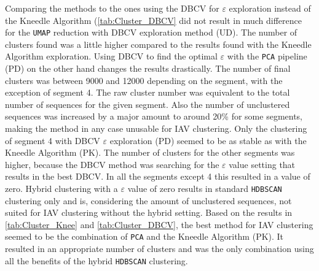 \vspace{1em}

Comparing the methods to the ones using the \gls{DBCV} for $\varepsilon$ exploration instead of the Kneedle Algorithm (\autoref{tab:Cluster_DBCV} did not result in much difference for the \texttt{UMAP} reduction with \gls{DBCV} exploration method (UD). The number of clusters found was a little higher compared to the results found with the Kneedle Algorithm exploration. Using \gls{DBCV} to find the optimal $\varepsilon$ with the \texttt{PCA} pipeline (PD) on the other hand changes the results drastically. The number of final clusters was between 9000 and 12000 depending on the segment, with the exception of segment 4. The raw cluster number was equivalent to the total number of sequences for the given segment. Also the number of unclustered sequences was increased by a major amount to around 20\% for some segments, making the method in any case unusable for \gls{IAV} clustering. Only the clustering of segment 4 with \gls{DBCV} $\varepsilon$ exploration (PD) seemed to be as stable as with the Kneedle Algorithm (PK). The number of clusters for the other segments was higher, because the \gls{DBCV} method was searching for the $\varepsilon$ value setting that results in the best \gls{DBCV}. In all the segments except 4 this resulted in a value of zero. Hybrid clustering with a $\varepsilon$ value of zero results in standard \texttt{HDBSCAN} clustering only and is, considering the amount of unclustered sequences, not suited for \gls{IAV} clustering without the hybrid setting. Based on the results in \autoref{tab:Cluster_Knee} and \autoref{tab:Cluster_DBCV}, the best method for \gls{IAV} clustering seemed to be the combination of \texttt{PCA} and the Kneedle Algorithm (PK). It resulted in an appropriate number of clusters and was the only combination using all the benefits of the hybrid \texttt{HDBSCAN} clustering. 

